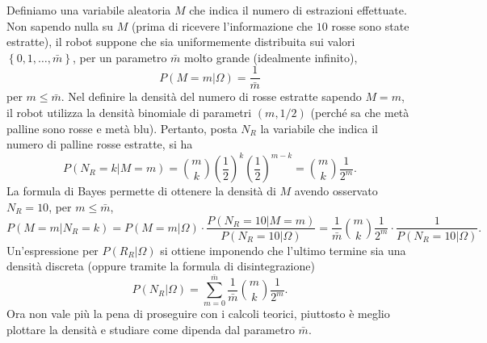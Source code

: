 \documentclass[
  italian,
  letterpaper,
]{book}
\newcommand{\bra}[1]{\left( #1 \right)}
\newcommand{\cur}[1]{\left\{ #1 \right\}}
\theoremstyle{definition}
\theoremstyle{remark}
\begin{document}
Definiamo una variabile aleatoria \(M\) che indica il numero di
estrazioni effettuate. Non sapendo nulla su \(M\) (prima di ricevere
l'informazione che \(10\) rosse sono state estratte), il robot suppone
che sia uniformemente distribuita sui valori
\(\cur{0,1, \ldots, \bar{m}}\), per un parametro \(\bar{m}\) molto
grande (idealmente infinito), \[ P(M=m|\Omega) = \frac {1}{\bar{m}}\]
per \(m \le \bar{m}\). Nel definire la densità del numero di rosse
estratte sapendo \(M = m\), il robot utilizza la densità binomiale di
parametri \((m,1/2)\) (perché sa che metà palline sono rosse e metà
blu). Pertanto, posta \(N_R\) la variabile che indica il numero di
palline rosse estratte, si ha
\[ P(  N_R = k | M=m) = {m\choose k} \bra{ \frac{1}{2}}^k \bra{\frac 1 2 }^{m-k} = {m \choose k} \frac {1}{2^m}.\]
La formula di Bayes permette di ottenere la densità di \(M\) avendo
osservato \(N_R = 10\), per \(m \le \bar{m}\),
\[ P(  M=m| N_R = k) = P(M=m|\Omega)\cdot \frac{P(N_R = 10| M=m)}{P(N_R = 10|\Omega)} = \frac{1}{\bar{m}} {m \choose k} \frac {1}{2^m} \cdot \frac{1}{P(N_R = 10|\Omega)}.\]
Un'espressione per \(P(R_R|\Omega)\) si ottiene imponendo che l'ultimo
termine sia una densità discreta (oppure tramite la formula di
disintegrazione)
\[P(N_R|\Omega) = \sum_{m=0}^{\bar{m}} \frac{1}{\bar{m}} {m \choose k} \frac {1}{2^m}.\]
Ora non vale più la pena di proseguire con i calcoli teorici, piuttosto
è meglio plottare la densità e studiare come dipenda dal parametro
\(\bar{m}\).
\end{document}
